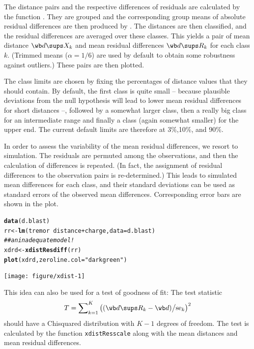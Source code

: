 \documentclass[11pt]{article}\usepackage[]{graphicx}\usepackage[]{color}
\makeatletter
\newcommand{\hlstr}[1]{\textcolor[rgb]{0.192,0.494,0.8}{#1}}%
\newcommand{\hlcom}[1]{\textcolor[rgb]{0.678,0.584,0.686}{\textit{#1}}}%
\newcommand{\hlopt}[1]{\textcolor[rgb]{0,0,0}{#1}}%
\newcommand{\hlstd}[1]{\textcolor[rgb]{0.345,0.345,0.345}{#1}}%
\newcommand{\hlkwb}[1]{\textcolor[rgb]{0.69,0.353,0.396}{#1}}%
\newcommand{\hlkwc}[1]{\textcolor[rgb]{0.333,0.667,0.333}{#1}}%
\newcommand{\hlkwd}[1]{\textcolor[rgb]{0.737,0.353,0.396}{\textbf{#1}}}%
\newenvironment{kframe}{%
 \def\at@end@of@kframe{}%
 \ifinner\ifhmode%
  \def\at@end@of@kframe{\end{minipage}}%
  \begin{minipage}{\columnwidth}%
 \fi\fi%
 \def\FrameCommand##1{\hskip\@totalleftmargin \hskip-\fboxsep
 \colorbox{shadecolor}{##1}\hskip-\fboxsep
     \hskip-\linewidth \hskip-\@totalleftmargin \hskip\columnwidth}%
 \MakeFramed {\advance\hsize-\width
   \@totalleftmargin\z@ \linewidth\hsize
   \@setminipage}}%
 {\par\unskip\endMakeFramed%
 \at@end@of@kframe}
\newenvironment{knitrout}{}{} %
\makeatother
\begin{document}
The distance pairs and the respective differences of residuals are
calculated by the function \Hneed{40mm}
. They are grouped and the
corresponding group means of absolute residual differences are then
produced by . 
The distances are then classified, and the residual differences
are averaged over these classes. This yields a pair of mean distance 
$\wb d\sups X_k$ and mean residual differences $\wb d\sups R_k$ 
for each class $k$. 
(Trimmed means ($\alpha=1/6$) are used by default to obtain some
robustness against outliers.)
These pairs are then plotted.

The class limits are chosen by fixing the percentages of distance values
that they should contain. By default, the first class is quite small -- 
because plausible deviations from the null hypothesis will lead to lower
mean residual differences for short distances --, followed by a somewhat
larger class, then a really big class for an intermediate range and finally
a class (again somewhat smaller) for the upper end. 
The current default limits are therefore at 3\%,10\%, and 90\%. 

In order to assess the variability of the mean residual differences,
we resort to simulation. The residuals are permuted among the observations,
and then the calculation of differences is repeated.
(In fact, the assignment of residual differences to the observation pairs 
is re-determined.) This leads to simulated mean differences for each class,
and their standard deviations can be used as standard errors of the 
observed mean differences. Corresponding error bars are shown in the
plot. 

\begin{knitrout}
\color{fgcolor}\begin{kframe}
\begin{alltt}
\hlkwd{data}\hlstd{(d.blast)}
\hlstd{rr} \hlkwb{<-} \hlkwd{lm}\hlstd{(tremor}\hlopt{~}\hlstd{distance}\hlopt{+}\hlstd{charge,} \hlkwc{data}\hlstd{=d.blast)}
\hlcom{## an inadequate model!}
\hlstd{xdrd} \hlkwb{<-} \hlkwd{xdistResdiff}\hlstd{(rr)}
\hlkwd{plot}\hlstd{(xdrd,} \hlkwc{zeroline.col}\hlstd{=}\hlstr{"darkgreen"}\hlstd{)}
\end{alltt}
\end{kframe}
\texttt{[image: figure/xdist-1]} 
\end{knitrout}

This idea can also be used for a test of goodness of fit: The test
statistic 
$$
  T = \sum\nolimits_{k=1}^K \left((\wb d\sups R_k-\wb d)\big/\mbox{se}_k\right)^2
$$
should have a Chisquared distribution with $K-1$ degrees of freedom.
The test is calculated by the function \texttt{xdistResscale} along with
the mean distances and mean residual differences.
\end{document}
